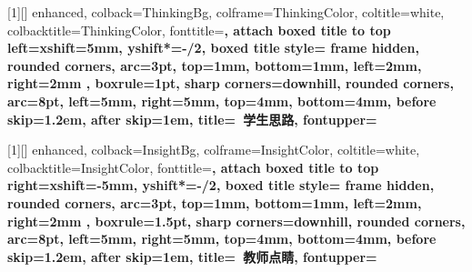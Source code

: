 \newenvironment{note}{
    \par\vspace{0.5em}\noindent
    \textbf{\color{NoteColor} 注：}
}{
    \par\vspace{0.5em}
}

\renewenvironment{proof}{
    \par\vspace{0.5em}\noindent
    \textbf{\color{LogicColor} 证明：}
}{
    \hfill \textcolor{LogicColor}{\rule{0.6em}{0.6em}} \par
}


[1][]{
    enhanced,
    colback=ThinkingBg,
    colframe=ThinkingColor,
    coltitle=white,
    colbacktitle=ThinkingColor,
    fonttitle=\bfseries,
    attach boxed title to top left={xshift=5mm, yshift*=-\tcboxedtitleheight/2},
    boxed title style={
        frame hidden,
        rounded corners,
        arc=3pt,
        top=1mm, bottom=1mm, left=2mm, right=2mm
    },
    boxrule=1pt,
    sharp corners=downhill, rounded corners, arc=8pt,
    left=5mm, right=5mm, top=4mm, bottom=4mm,
    before skip=1.2em, after skip=1em,
    title={\faUser\ 学生思路},
    fontupper=\kaishu\linespread{1.5}\selectfont
}

\newenvironment{studentthinking}[1][]
{\begin{thinkingBox}{#1}}
{\end{thinkingBox}}

[1][]{
    enhanced,
    colback=InsightBg,
    colframe=InsightColor,
    coltitle=white,
    colbacktitle=InsightColor,
    fonttitle=\bfseries,
    attach boxed title to top right={xshift=-5mm, yshift*=-\tcboxedtitleheight/2},
    boxed title style={
        frame hidden,
        rounded corners,
        arc=3pt,
        top=1mm, bottom=1mm, left=2mm, right=2mm
    },
    boxrule=1.5pt,
    sharp corners=downhill, rounded corners, arc=8pt,
    left=5mm, right=5mm, top=4mm, bottom=4mm,
    before skip=1.2em, after skip=1em,
    title={\faLightbulbO\ 教师点睛},
    fontupper=\bfseries\color{InsightColor}\linespread{1.5}\selectfont
}

\newenvironment{teacherinsight}[1][]
{\begin{insightBox}{#1}}
{\end{insightBox}}

